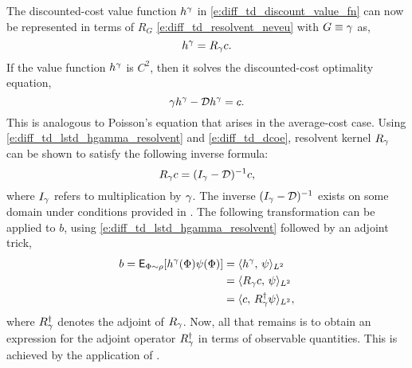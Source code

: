 The discounted-cost value function $h^\gamma$ in \eqref{e:diff_td_discount_value_fn} can now be represented in terms of $R_G$ \eqref{e:diff_td_resolvent_neveu} with $G \equiv \gamma$ as,
\begin{equation}
h^\discount = R_\discount c.
\label{e:diff_td_lstd_hgamma_resolvent}
\end{equation}
If the value function $h^\gamma$ is $C^2$, then it solves the discounted-cost optimality equation,
\begin{equation}
\discount h^\discount - \generate h^\discount =  c.
\label{e:diff_td_dcoe}
\end{equation}
This is analogous to Poisson's equation that arises in the average-cost case. 
Using \eqref{e:diff_td_lstd_hgamma_resolvent} and \eqref{e:diff_td_dcoe}, resolvent kernel $R_\gamma$ can be shown to satisfy the following inverse formula:
\begin{equation}
R_\gamma c = ( I_\gamma - {\cal D})^{-1} c,
\end{equation}
where $I_\gamma$ refers to multiplication by $\gamma$. The inverse $(I_\gamma - {\cal D})^{-1}$ exists on some domain under conditions provided in \cite{devkonmey17a}.  
The following transformation can be applied to $b$, using \eqref{e:diff_td_lstd_hgamma_resolvent} followed by an adjoint trick,
\begin{equation}
\begin{aligned}
b = \Expect_{\markovstate \sim \pr} [h^\discount(\markovstate) \basis(\markovstate) ] &= \langle h^\discount, \, \basis \rangle_{L^2}\\
& = \langle R_\discount c, \,\basis \rangle_{L^2} \\
& = \langle c,\, R^\dagger_\discount \basis \rangle_{L^2},
\label{e:diff_td_lstd_b_R_adjoint}
\end{aligned}
\end{equation}
where $R^\dagger_\gamma$ denotes the adjoint of $R_\gamma$. Now, all that remains is to obtain an expression for the adjoint operator $R^\dagger_\gamma$ in terms of observable quantities. This is achieved by the application of .

